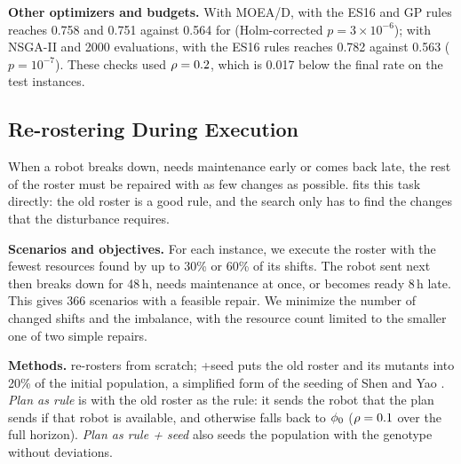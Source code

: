 \textbf{Other optimizers and budgets.}
With MOEA/D, \RDD with the ES16 and GP rules reaches 0.758 and 0.751 against 0.564 for  (Holm-corrected $p = 3 \times 10^{-6}$);
with NSGA-II and 2000 evaluations, \RDD with the ES16 rules reaches 0.782 against 0.563 ($p = 10^{-7}$).
These checks used $\rho = 0.2$, which is 0.017 below the final rate on the test instances.

\subsection{Re-rostering During Execution}
\label{sec:exp-rerostering}


When a robot breaks down, needs maintenance early or comes back late, the rest of the roster must be repaired with as few changes as possible.
\RDD fits this task directly: the old roster is a good rule, and the search only has to find the changes that the disturbance requires.

\textbf{Scenarios and objectives.}
For each instance, we execute the roster with the fewest resources found by  up to 30\% or 60\% of its shifts.
The robot sent next then breaks down for 48\,h, needs maintenance at once, or becomes ready 8\,h late.
This gives 366 scenarios with a feasible repair.
We minimize the number of changed shifts and the imbalance, with the resource count limited to the smaller one of two simple repairs.

\textbf{Methods.}
 re-rosters from scratch; +seed puts the old roster and its mutants into 20\% of the initial population, a simplified form of the seeding of Shen and Yao \cite{shen2015dfjsp}.
\emph{Plan as rule} is \RDD with the old roster as the rule: it sends the robot that the plan sends if that robot is available, and otherwise falls back to $\phi_0$ ($\rho = 0.1$ over the full horizon).
\emph{Plan as rule + seed} also seeds the population with the genotype without deviations.

